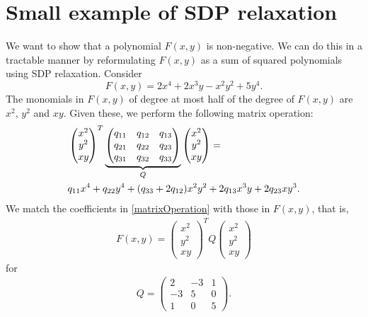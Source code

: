 \documentclass[a4paper,twoside,justified]{tufte-handout}
\begin{document}
\section{Small example of SDP relaxation}
We want to show that a polynomial $F(x,y)$ is non-negative. We can do this in a tractable manner by reformulating $F(x,y)$ as a sum of squared polynomials using SDP relaxation. Consider
\begin{equation*}
F(x,y)=2x^4+2x^3y-x^2y^2+5y^4.
\end{equation*}
The monomials in $F(x,y)$ of degree at most half of the degree of $F(x,y)$ are $x^2$, $y^2$ and $xy$. Given these, we perform the following matrix operation:
\begin{align}
\label{matrixOperation}
&\begin{pmatrix}
x^2\\
y^2\\
xy
\end{pmatrix}^T
\underbrace{
\begin{pmatrix}
q_{11} & q_{12} & q_{13}\\
q_{21} & q_{22} & q_{23}\\
q_{31} & q_{32} & q_{33}
\end{pmatrix}
}_Q
\begin{pmatrix}
x^2\\
y^2\\
xy
\end{pmatrix}
=\notag\\
&q_{11}x^4+q_{22}y^4+(q_{33}+2q_{12})x^2y^2+2q_{13}x^3y+2q_{23}xy^3.
\end{align}
We match the coefficients in \eqref{matrixOperation} with those in $F(x,y)$, that is,
\begin{eqnarray*}
F(x,y)=\begin{pmatrix}
x^2\\
y^2\\
xy
\end{pmatrix}^T
Q
\begin{pmatrix}
x^2\\
y^2\\
xy
\end{pmatrix}
\end{eqnarray*}
for
\begin{eqnarray*}
Q=
\begin{pmatrix}
2 & -3 & 1\\
-3 & 5 & 0\\
1 & 0 & 5
\end{pmatrix}.
\end{eqnarray*}
\end{document}
